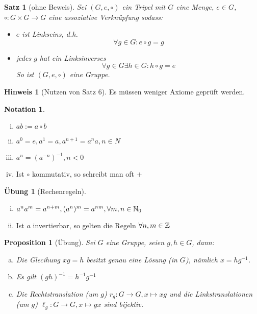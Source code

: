 \documentclass[a4paper]{article}
\theoremstyle{plain}
\newtheorem{prop}[thm]{Proposition}
\newtheorem{satz}[thm]{Satz}
\theoremstyle{definition}
\newtheorem*{hin*}{Hinweis}
\newtheorem*{nota*}{Notation}
\newtheorem*{ubng*}{Übung}
\begin{document}
\begin{satz}[ohne Beweis]%
  Sei $(G, e, \circ)$ ein Tripel  mit $G$ eine Menge, $e \in G$, $\circ : G \times G \to G$ eine assoziative Verknüpfung sodass:
  \begin{itemize}
    \item  $e$ ist Linkseins, d.h.
    $$\forall g \in G : e \circ g = g$$
    \item jedes $g$ hat ein Linksinverses $$\forall g \in G \exists h \in G : h \circ g = e$$
    So ist $(G, e, \circ)$ eine Gruppe.
  \end{itemize}
\end{satz}
\begin{hin*}[Nutzen von Satz 6]
  Es müssen weniger Axiome geprüft werden.
\end{hin*}
\begin{nota*}
  \item
  \begin{enumerate}[(i)]
\item $ab := a \circ b$
\item $a^{0} = e, a^{1}=a, a^{n+1}=a^{n}a, n \in N$
    \item $a^{n} = (a^{-n})^{-1}, n < 0$

\item  Ist $\circ$ kommutativ, so schreibt man oft $+$
  \end{enumerate}
\end{nota*}
\begin{ubng*}[Rechenregeln]
  \item
  \begin{enumerate}[(i)]
\item  $a^{n}a^{m}=a^{n+m}, (a^{n})^{m}=a^{nm}, \forall m,n \in \Bbb N_{0}$
\item  Ist $a$ invertierbar, so gelten die Regeln $\forall n,m \in \Bbb Z$
  \end{enumerate}
\end{ubng*}

\begin{prop}[Übung]
  Sei $G$ eine Gruppe, seien $g,h \in G$, dann:
  \begin{enumerate}[(a)]
    \item Die Glecihung $xg = h$ besitzt genau eine Lösung (in $G$), nämlich $x=hg^{-1}$.
    \item Es gilt $(gh)^{-1} = h^{-1}g^{-1}$
    \item Die Rechtstranslation (um $g$) $r_{g}: G \to G, x \mapsto xg$ und die Linkstranslationen (um $g$) $\ell_{g}: G \to G, x \mapsto gx$
    sind bijektiv.

  \end{enumerate}
\end{prop}
\end{document}
